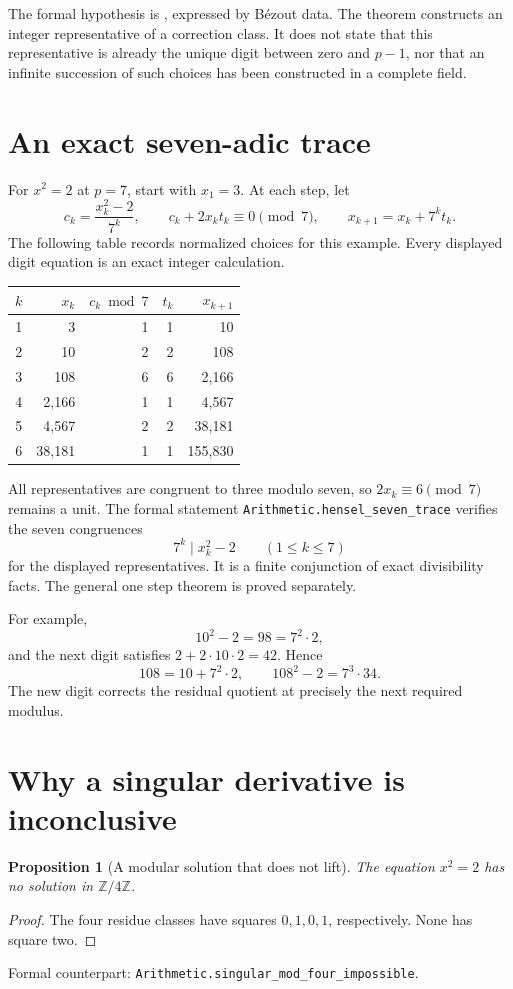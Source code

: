 \documentclass[11pt,letterpaper,oneside,openany]{book}
\theoremstyle{quiet}
\newtheorem{proposition}[theorem]{Proposition}
\newcommand{\Z}{\mathbb{Z}}
\newcommand{\code}[1]{\texttt{\detokenize{#1}}}
\newcommand{\decl}[1]{{\small\nolinkurl{#1}}}
\newcommand{\formal}[1]{\par\nobreak\begingroup\footnotesize\color{Slate}\sffamily Formal counterpart: \normalfont\nolinkurl{#1}.\par\endgroup}
\begin{document}
The formal hypothesis is \code{IsCoprime (2 * x) p}, expressed by B\'ezout data. The theorem constructs an integer representative of a correction class. It does not state that this representative is already the unique digit between zero and $p-1$, nor that an infinite succession of such choices has been constructed in a complete field.

\section{An exact seven-adic trace}\label{sec:trace}
For $x^2=2$ at $p=7$, start with $x_1=3$. At each step, let
\[
c_k=\frac{x_k^2-2}{7^k},\qquad
c_k+2x_kt_k\equiv0\pmod7,\qquad
x_{k+1}=x_k+7^kt_k.
\]
The following table records normalized choices for this example. Every displayed digit equation is an exact integer calculation.

\begin{center}
\begin{tabular}{@{}rrrrr@{}}
\toprule
$k$ & $x_k$ & $c_k\bmod7$ & $t_k$ & $x_{k+1}$\\
\midrule
1 & 3 & 1 & 1 & 10\\
2 & 10 & 2 & 2 & 108\\
3 & 108 & 6 & 6 & 2,166\\
4 & 2,166 & 1 & 1 & 4,567\\
5 & 4,567 & 2 & 2 & 38,181\\
6 & 38,181 & 1 & 1 & 155,830\\
\bottomrule
\end{tabular}
\end{center}

All representatives are congruent to three modulo seven, so $2x_k\equiv6\pmod7$ remains a unit. The formal statement \decl{Arithmetic.hensel_seven_trace} verifies the seven congruences
\[
7^k\mid x_k^2-2\qquad (1\leq k\leq7)
\]
for the displayed representatives. It is a finite conjunction of exact divisibility facts. The general one step theorem is proved separately.

For example,
\[
10^2-2=98=7^2\cdot2,
\]
and the next digit satisfies $2+2\cdot10\cdot2=42$. Hence
\[
108=10+7^2\cdot2,
\qquad 108^2-2=7^3\cdot34.
\]
The new digit corrects the residual quotient at precisely the next required modulus.

\section{Why a singular derivative is inconclusive}
\begin{proposition}[A modular solution that does not lift]\label{prop:mod4}
The equation $x^2=2$ has no solution in $\Z/4\Z$.
\end{proposition}
\begin{proof}
The four residue classes have squares $0,1,0,1$, respectively. None has square two.
\end{proof}
\formal{Arithmetic.singular_mod_four_impossible}
\end{document}
